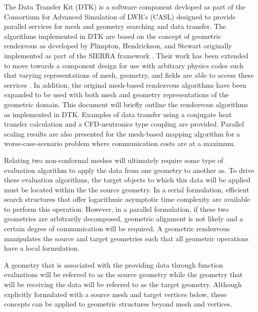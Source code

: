 \documentclass{mc2013}
\begin{document}
The Data Transfer Kit (DTK) is a software component devloped as part
of the Consortium for Advanced Simulation of LWR's (CASL)
\cite{u.s._department_of_energy_casl_2011} designed to provide
parallel services for mesh and geometry searching and data
transfer. The algorithms implemented in DTK are based on the concept
of geometric rendezvous as developed by Plimpton, Hendrickson, and
Stewart \cite{Plimpton_2004} originally implemented as part of the
SIERRA framework \cite{Stewart_2004}. Their work has been extended to
move towards a component design for use with arbitrary physics codes
such that varying representations of mesh, geometry, and fields are
able to access these services \cite{Chand_2008}. In addition, the
original mesh-based rendezvous algorithms have been expanded to be
used with both mesh and geometry representations of the geometric
domain. This document will briefly outline the rendezvous algorithms
as implemented in DTK. Examples of data transfer using a conjugate
heat transfer calculation and a CFD-neutronics type coupling are
provided. Parallel scaling results are also presented for the
mesh-based mapping algorithm for a worse-case-scenario problem where
communication costs are at a maximum.


\label{sec:geometric_rendezvous}

Relating two non-conformal meshes will ultimately require some type of
evaluation algorithm to apply the data from one geometry to another
as. To drive these evaluation algorithms, the target objects to which
this data will be applied must be located within the the source
geometry. In a serial formulation, efficient search structures that
offer logarithmic asymptotic time complexity are available to perform
this operation. However, in a parallel formulation, if these two
geometries are arbitrarily decomposed, geometric alignment is not
likely and a certain degree of communication will be required. A
geometric rendezvous manipulates the source and target geometries such
that all geometric operations have a local formulation.

A geometry that is associated with the providing data through function
evaluations will be referred to as the source geometry while the
geometry that will be receiving the data will be referred to as the
target geometry. Although explicitly formulated with a source mesh and
target vertices below, these concepts can be applied to geometric
structures beyond mesh and vertices.
\end{document}
